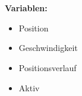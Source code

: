 \\\\
\textbf{Variablen:}
\begin{itemize}
	\item Position
	\item Geschwindigkeit
	\item Positionsverlauf
	\item Aktiv
\end{itemize}